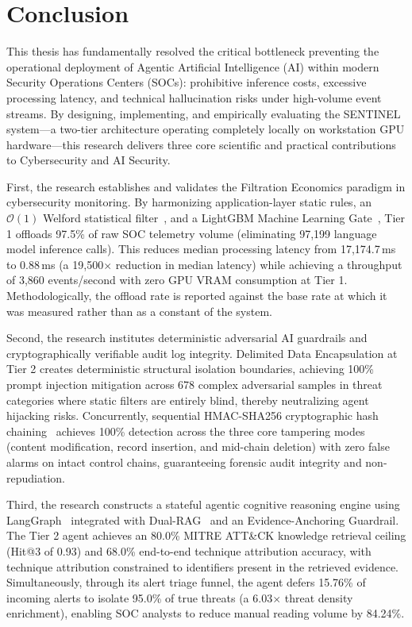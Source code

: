 \chapter{Conclusion}
\label{ch:conclusion}

This thesis has fundamentally resolved the critical bottleneck preventing the operational deployment of Agentic Artificial Intelligence (AI) within modern Security Operations Centers (SOCs): prohibitive inference costs, excessive processing latency, and technical hallucination risks under high-volume event streams. By designing, implementing, and empirically evaluating the SENTINEL system---a two-tier architecture operating completely locally on workstation GPU hardware---this research delivers three core scientific and practical contributions to Cybersecurity and AI Security.

First, the research establishes and validates the Filtration Economics paradigm in cybersecurity monitoring. By harmonizing application-layer static rules, an $\mathcal{O}(1)$ Welford statistical filter~\cite{welford1962}, and a LightGBM Machine Learning Gate~\cite{ke2017lightgbm}, Tier 1 offloads 97.5\% of raw SOC telemetry volume (eliminating 97,199 language model inference calls). This reduces median processing latency from 17,174.7\,ms to 0.88\,ms (a 19,500$\times$ reduction in median latency) while achieving a throughput of 3,860 events/second with zero GPU VRAM consumption at Tier 1. Methodologically, the offload rate is reported against the base rate at which it was measured rather than as a constant of the system.

Second, the research institutes deterministic adversarial AI guardrails and cryptographically verifiable audit log integrity. Delimited Data Encapsulation at Tier 2 creates deterministic structural isolation boundaries, achieving 100\% prompt injection mitigation across 678 complex adversarial samples in threat categories where static filters are entirely blind, thereby neutralizing agent hijacking risks. Concurrently, sequential HMAC-SHA256 cryptographic hash chaining~\cite{hmac1997} achieves 100\% detection across the three core tampering modes (content modification, record insertion, and mid-chain deletion) with zero false alarms on intact control chains, guaranteeing forensic audit integrity and non-repudiation.

Third, the research constructs a stateful agentic cognitive reasoning engine using LangGraph~\cite{langgraph2024} integrated with Dual-RAG~\cite{rag2020} and an Evidence-Anchoring Guardrail. The Tier 2 agent achieves an 80.0\% MITRE ATT\&CK knowledge retrieval ceiling (Hit@3 of 0.93) and 68.0\% end-to-end technique attribution accuracy, with technique attribution constrained to identifiers present in the retrieved evidence. Simultaneously, through its alert triage funnel, the agent defers 15.76\% of incoming alerts to isolate 95.0\% of true threats (a 6.03$\times$ threat density enrichment), enabling SOC analysts to reduce manual reading volume by 84.24\%.

